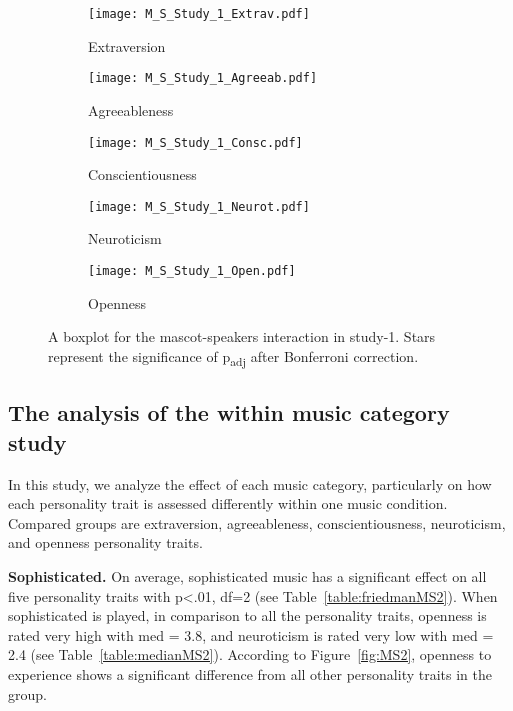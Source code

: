 \begin{figure}[hbt!]
    \centering
    \begin{subfigure}{.40\textwidth}
        \centering
        \texttt{[image: M\_S\_Study\_1\_Extrav.pdf]}
        \caption{Extraversion}
        \label{fig:sub1}
    \end{subfigure}\hfill%
    \begin{subfigure}{.40\textwidth}
        \centering
        \texttt{[image: M\_S\_Study\_1\_Agreeab.pdf]}
        \caption{Agreeableness}
        \label{fig:sub2}
    \end{subfigure}\hfill
    \begin{subfigure}{.40\textwidth}
        \centering
        \texttt{[image: M\_S\_Study\_1\_Consc.pdf]}
        \caption{Conscientiousness}
        \label{fig:sub1}
    \end{subfigure}\hfill%
    \begin{subfigure}{.40\textwidth}
        \centering
        \texttt{[image: M\_S\_Study\_1\_Neurot.pdf]}
        \caption{Neuroticism}
        \label{fig:sub1}
    \end{subfigure}\hfill%
    \begin{subfigure}{.40\textwidth}
        \centering
        \texttt{[image: M\_S\_Study\_1\_Open.pdf]}
        \caption{Openness}
        \label{fig:sub1}
    \end{subfigure}\hfill%
    \caption{A boxplot for the mascot-speakers interaction in study-1.
    Stars represent the significance of p\textsubscript{adj} after Bonferroni correction.}
    \label{fig:MS1}
\end{figure}
\subsection{The analysis of the within music category study}
\label{subsec:MSstudy2}
In this study, we analyze the effect of each music category, particularly on how each personality
trait is assessed differently within one music condition.
Compared groups are extraversion, agreeableness, conscientiousness, neuroticism, and openness personality traits.

\par\textbf{Sophisticated.}
On average, sophisticated music has a significant effect on all five personality traits with
p<.01, df=2 (see Table~\ref{table:friedmanMS2}).
When sophisticated is played, in comparison to all the personality traits,
openness is rated very high with med = 3.8, and neuroticism
is rated very low with med = 2.4 (see Table~\ref{table:medianMS2}).
According to Figure~\ref{fig:MS2}, openness to experience shows a
significant difference from all other personality traits in the group.

